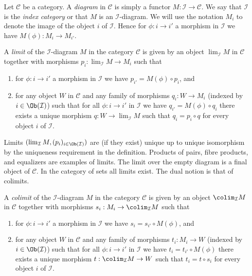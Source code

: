 \noindent
Let $\mathcal{C}$ be a category. A {\it diagram} in $\mathcal{C}$ is
simply a functor $M : \mathcal{I} \to \mathcal{C}$. We say that
$\mathcal{I}$ is the {\it index category} or that $M$ is an
$\mathcal{I}$-diagram. We will use the notation $M_i$ to denote the
image of the object
$i$ of $\mathcal{I}$. Hence for $\phi : i \to i'$ a morphism
in $\mathcal{I}$ we have $M(\phi) : M_i \to M_{i'}$.

\begin{definition}
\label{definition-limit}
A {\it limit} of the $\mathcal{I}$-diagram $M$ in the category
$\mathcal{C}$ is given by an object $\lim_\mathcal{I} M$ in $\mathcal{C}$
together with morphisms $p_i : \lim_\mathcal{I} M \to M_i$ such that
\begin{enumerate}
\item for $\phi : i \to i'$ a morphism
in $\mathcal{I}$ we have $p_{i'} =  M(\phi) \circ p_i$, and
\item for any object $W$ in $\mathcal{C}$ and any family of
morphisms $q_i : W \to M_i$ (indexed by $i \in \Ob(\mathcal{I})$)
such that for all $\phi : i \to i'$
in $\mathcal{I}$ we have $q_{i'} = M(\phi) \circ q_i$ there
exists a unique morphism $q : W \to \lim_\mathcal{I} M$ such that
$q_i = p_i \circ q$ for every object $i$ of $\mathcal{I}$.
\end{enumerate}
\end{definition}

\noindent
Limits $(\lim_\mathcal{I} M, (p_i)_{i\in \Ob(\mathcal{I})})$ are
(if they exist)
unique up to unique isomorphism by the uniqueness requirement
in the definition. Products of pairs, fibre products, and equalizers are
examples of limits. The limit over the empty diagram is a final object
of $\mathcal{C}$.
In the category of sets all limits exist.
The dual notion is that of colimits.

\begin{definition}
\label{definition-colimit}
A {\it colimit} of the $\mathcal{I}$-diagram $M$ in the category
$\mathcal{C}$ is given by an object $\colim_\mathcal{I} M$ in $\mathcal{C}$
together with morphisms $s_i : M_i \to \colim_\mathcal{I} M$ such that
\begin{enumerate}
\item for $\phi : i \to i'$ a morphism
in $\mathcal{I}$ we have $s_i = s_{i'} \circ M(\phi)$, and
\item for any object $W$ in $\mathcal{C}$ and any family of
morphisms $t_i : M_i \to W$ (indexed by $i \in \Ob(\mathcal{I})$)
such that for all $\phi : i \to i'$
in $\mathcal{I}$ we have $t_i = t_{i'} \circ M(\phi)$ there
exists a unique morphism $t : \colim_\mathcal{I} M \to W$ such that
$t_i = t \circ s_i$ for every object $i$ of $\mathcal{I}$.
\end{enumerate}
\end{definition}

